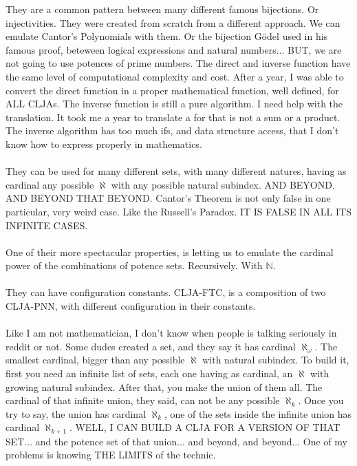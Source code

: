 		\noindent
		They are a common pattern between many different famous bijections. Or injectivities. They were created from scratch from a different approach. We can emulate Cantor's Polynomials with them. Or the bijection Gödel used in his famous proof, beteween logical expressions and natural numbers... BUT, we are not going to use potences of prime numbers. The direct and inverse function have the same level of computational complexity and cost. After a year, I was able to convert the direct function in a proper mathematical function, well defined, for ALL CLJAs. The inverse function is still a pure algorithm. I need help with the translation. It took me a year to translate a for that is not a sum or a product. The inverse algorithm has too much ifs, and data structure access, that I don't know how to express properly in mathematics.
		\\\\
		
		\noindent
		They can be used for many different sets, with many different natures, having as cardinal any possible $\aleph$ with any possible natural subindex. AND BEYOND. AND BEYOND THAT BEYOND. Cantor's Theorem is not only false in one particular, very weird case. Like the Russell's Paradox. IT IS FALSE IN ALL ITS INFINITE CASES.
		\\\\
		
		\noindent
		One of their more spectacular properties, is letting us to emulate the cardinal power of the combinations of potence sets. Recursively. With $\mathbb{N}$.
		\\\\
		
		\noindent
		They can have configuration constants. CLJA-FTC, is a composition of two CLJA-PNN, with different configuration in their constants.
		\\\\
		
		\noindent
		Like I am not mathematician, I don't know when people is talking seriously in reddit or not. Some dudes created a set, and they say it has cardinal $\aleph_{\omega}$. The smallest cardinal, bigger than any possible $\aleph$ with natural subindex. To build it, first you need an infinite list of sets, each one having as cardinal, an $\aleph$ with growing natural subindex. After that, you make the union of them all. The cardinal of that infinite union, they said, can not be any possible $\aleph_{k}$. Once you try to say, the union has cardinal $\aleph_{k}$, one of the sets inside the infinite union has cardinal $\aleph_{k+1}$. WELL, I CAN BUILD A CLJA FOR A VERSION OF THAT SET... and the potence set of that union... and beyond, and beyond... One of my problems is knowing THE LIMITS of the technic.
		\\\\
		
